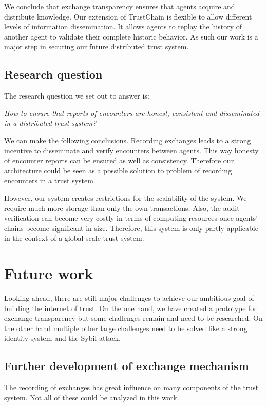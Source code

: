 We conclude that exchange transparency ensures that agents acquire and distribute knowledge. Our 
extension of TrustChain is flexible to allow different levels of information dissemination. It allows
agents to replay the history of another agent to validate their complete historic behavior. As such
our work is a major step in securing our future distributed trust system.

\subsection{Research question}
The research question we set out to answer is:
\begin{center}
    \textit{How to ensure that reports of encounters are honest, consistent and disseminated in a distributed trust system?}
\end{center}

We can make the following conclusions. Recording exchanges 
leads to a strong incentive to disseminate and verify encounters between agents. This way honesty
of encounter reports can be ensured as well as consistency. Therefore our architecture could be 
seen as a possible solution to problem of recording encounters in a trust system. 

However, our system creates restrictions for the scalability of the system. We require much more 
storage than only the own transactions. Also, the audit verification can become very costly in terms of computing resources
once agents' chains become significant in size. Therefore, this system is only partly applicable in the 
context of a global-scale trust system. 

\section{Future work}
Looking ahead, there are still major challenges to achieve our ambitious goal of building the 
internet of trust. On the one hand, we have created a prototype for exchange transparency but some 
challenges remain and need to be researched. On the other hand multiple other large challenges need
to be solved like a strong identity system and the Sybil attack.

\subsection{Further development of exchange mechanism}
The recording of exchanges has great influence on many components of the trust system. Not all of 
these could be analyzed in this work. 

